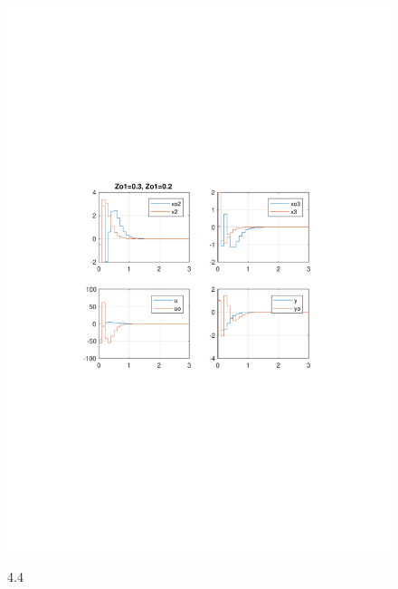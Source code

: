\documentclass{article}
\begin{document}
\begin{figure}[H]
\includegraphics[clip, trim=2cm 10cm 2cm 9.5cm, width=1.00\textwidth]{../rys/zad4_rys4.pdf}
\label{fig:rys4.4}
\caption{4.4}
\end{figure}
\end{document}
